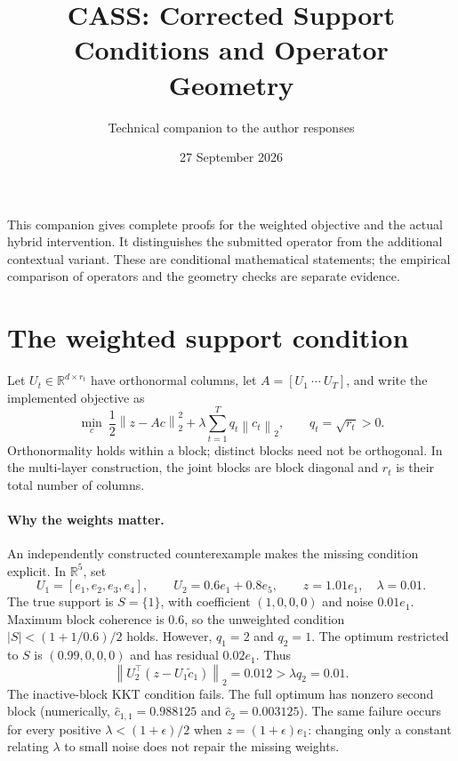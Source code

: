 \documentclass[11pt]{article}
\title{CASS: Corrected Support Conditions and Operator Geometry}
\author{Technical companion to the author responses}
\date{27 September 2026}
\newcommand{\norm}[1]{\left\lVert#1\right\rVert}
\newcommand{\R}{\mathbb R}
\begin{document}
\maketitle

This companion gives complete proofs for the weighted objective and the actual
hybrid intervention. It distinguishes the submitted operator from the additional
contextual variant. These are conditional mathematical statements; the empirical
comparison of operators and the geometry checks are separate evidence.

\section{The weighted support condition}

Let $U_t\in\R^{d\times r_t}$ have orthonormal columns, let
$A=[U_1\ \cdots\ U_T]$, and write the implemented objective as
\begin{equation}\label{eq:objective}
 \min_c\ \frac12\norm{z-Ac}_2^2+\lambda\sum_{t=1}^T q_t\norm{c_t}_2,
 \qquad q_t=\sqrt{r_t}>0.
\end{equation}
Orthonormality holds within a block; distinct blocks need not be orthogonal.
In the multi-layer construction, the joint blocks are block diagonal and $r_t$
is their total number of columns.

\paragraph{Why the weights matter.}
An independently constructed counterexample makes the missing condition
explicit. In $\R^5$, set
\[
 U_1=[e_1,e_2,e_3,e_4],\qquad U_2=0.6e_1+0.8e_5,
 \qquad z=1.01e_1,\quad\lambda=0.01.
\]
The true support is $S=\{1\}$, with coefficient $(1,0,0,0)$ and noise
$0.01e_1$. Maximum block coherence is $0.6$, so the unweighted condition
$|S|<(1+1/0.6)/2$ holds. However, $q_1=2$ and $q_2=1$. The optimum restricted
to $S$ is $(0.99,0,0,0)$ and has residual $0.02e_1$. Thus
\[
 \norm{U_2^\top(z-U_1\widetilde c_1)}_2=0.012>\lambda q_2=0.01.
\]
The inactive-block KKT condition fails. The full optimum has nonzero second
block (numerically, $\widehat c_{1,1}=0.988125$ and $\widehat c_2=0.003125$).
The same failure occurs for every positive $\lambda<(1+\epsilon)/2$ when
$z=(1+\epsilon)e_1$: changing only a constant relating $\lambda$ to small
noise does not repair the missing weights.
\end{document}
